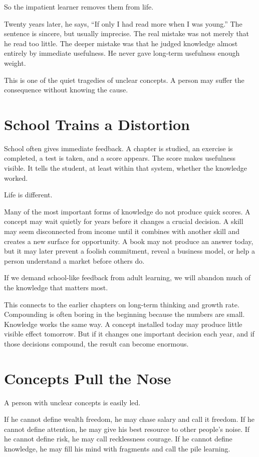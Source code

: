 So the impatient learner removes them from life.

Twenty years later, he says, ``If only I had read more when I was young.'' The sentence is sincere, but usually imprecise. The real mistake was not merely that he read too little. The deeper mistake was that he judged knowledge almost entirely by immediate usefulness. He never gave long-term usefulness enough weight.

This is one of the quiet tragedies of unclear concepts. A person may suffer the consequence without knowing the cause.

\section*{School Trains a Distortion}

School often gives immediate feedback. A chapter is studied, an exercise is completed, a test is taken, and a score appears. The score makes usefulness visible. It tells the student, at least within that system, whether the knowledge worked.

Life is different.

Many of the most important forms of knowledge do not produce quick scores. A concept may wait quietly for years before it changes a crucial decision. A skill may seem disconnected from income until it combines with another skill and creates a new surface for opportunity. A book may not produce an answer today, but it may later prevent a foolish commitment, reveal a business model, or help a person understand a market before others do.

If we demand school-like feedback from adult learning, we will abandon much of the knowledge that matters most.

This connects to the earlier chapters on long-term thinking and growth rate. Compounding is often boring in the beginning because the numbers are small. Knowledge works the same way. A concept installed today may produce little visible effect tomorrow. But if it changes one important decision each year, and if those decisions compound, the result can become enormous.

\section*{Concepts Pull the Nose}

A person with unclear concepts is easily led.

If he cannot define wealth freedom, he may chase salary and call it freedom. If he cannot define attention, he may give his best resource to other people's noise. If he cannot define risk, he may call recklessness courage. If he cannot define knowledge, he may fill his mind with fragments and call the pile learning.

